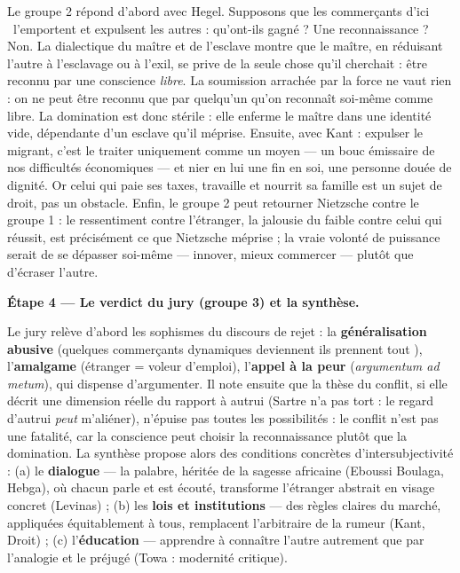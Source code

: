 \documentclass[11pt]{article}
\begin{document}
\begin{exoresolu}
Le groupe 2 répond d'abord avec Hegel. Supposons que les commerçants \guillemotleft d'ici \guillemotright\ l'emportent et expulsent les autres : qu'ont-ils gagné ? Une reconnaissance ? Non. La dialectique du maître et de l'esclave montre que le maître, en réduisant l'autre à l'esclavage ou à l'exil, se prive de la seule chose qu'il cherchait : être reconnu par une conscience \emph{libre}. La soumission arrachée par la force ne vaut rien : on ne peut être reconnu que par quelqu'un qu'on reconnaît soi-même comme libre. La domination est donc stérile : elle enferme le maître dans une identité vide, dépendante d'un esclave qu'il méprise. Ensuite, avec Kant : expulser le migrant, c'est le traiter uniquement comme un moyen — un bouc émissaire de nos difficultés économiques — et nier en lui une fin en soi, une personne douée de dignité. Or celui qui paie ses taxes, travaille et nourrit sa famille est un sujet de droit, pas un obstacle. Enfin, le groupe 2 peut retourner Nietzsche contre le groupe 1 : le ressentiment contre l'étranger, la jalousie du faible contre celui qui réussit, est précisément ce que Nietzsche méprise ; la vraie volonté de puissance serait de se dépasser soi-même — innover, mieux commercer — plutôt que d'écraser l'autre.\par
\textbf{Étape 4 — Le verdict du jury (groupe 3) et la synthèse.}\par
Le jury relève d'abord les sophismes du discours de rejet : la \textbf{généralisation abusive} (quelques commerçants dynamiques deviennent \guillemotleft ils prennent tout \guillemotright), l'\textbf{amalgame} (étranger = voleur d'emploi), l'\textbf{appel à la peur} (\emph{argumentum ad metum}), qui dispense d'argumenter. Il note ensuite que la thèse du conflit, si elle décrit une dimension réelle du rapport à autrui (Sartre n'a pas tort : le regard d'autrui \emph{peut} m'aliéner), n'épuise pas toutes les possibilités : le conflit n'est pas une fatalité, car la conscience peut choisir la reconnaissance plutôt que la domination. La synthèse propose alors des conditions concrètes d'intersubjectivité : (a) le \textbf{dialogue} — la palabre, héritée de la sagesse africaine (Eboussi Boulaga, Hebga), où chacun parle et est écouté, transforme l'étranger abstrait en visage concret (Levinas) ; (b) les \textbf{lois et institutions} — des règles claires du marché, appliquées équitablement à tous, remplacent l'arbitraire de la rumeur (Kant, Droit) ; (c) l'\textbf{éducation} — apprendre à connaître l'autre autrement que par l'analogie et le préjugé (Towa : modernité critique).\par

\end{exoresolu}
\end{document}
